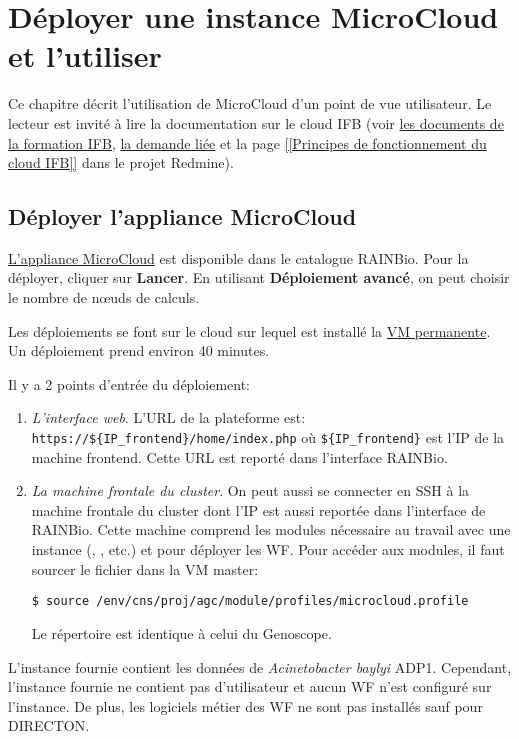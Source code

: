 \chapter{Déployer une instance MicroCloud et l'utiliser} \label{chap:deploiement}

Ce chapitre décrit l'utilisation de MicroCloud d'un point de vue utilisateur.
Le lecteur est invité à lire la documentation sur le cloud IFB
(voir \href{https://intranet.genoscope.cns.fr/agc/redmine/documents/86}{les documents de la formation IFB},
\href{https://intranet.genoscope.cns.fr/agc/redmine/issues/6010}{la demande liée}
et la page \href{https://intranet.genoscope.cns.fr/agc/redmine/projects/microcloud/wiki/Principes_de_fonctionnement_du_cloud_IFB}{[[Principes de fonctionnement du cloud IFB]]}
dans le projet Redmine).

\section{Déployer l'appliance MicroCloud}

\href{https://biosphere.france-bioinformatique.fr/catalogue/appliance/150/}{L'appliance MicroCloud} est disponible dans le catalogue RAINBio.
Pour la déployer, cliquer sur \textbf{Lancer}.
En utilisant \textbf{Déploiement avancé}, on peut choisir le nombre de nœuds de calculs.

Les déploiements se font sur le cloud  sur lequel est installé la \hyperref[VM permanente]{VM permanente}.
Un déploiement prend environ 40 minutes.

\bigskip

Il y a 2 points d'entrée du déploiement:
\begin{enumerate}
    \item \emph{L'interface web}. L'URL de la plateforme est: \nolinkurl{https://${IP_frontend}/home/index.php} où \nolinkurl{${IP_frontend}}
          est l'IP de la machine frontend.
          Cette URL est reporté dans l'interface RAINBio.
    \item \emph{La machine frontale du cluster}. On peut aussi se connecter en SSH à la machine frontale du cluster
          dont l'IP est aussi reportée dans l'interface de RAINBio.
          Cette machine comprend les modules nécessaire au travail avec une instance (, , etc.)
          et  pour déployer les WF.
          Pour accéder aux modules, il faut sourcer le fichier  dans la VM master:
          \begin{lstlisting}[style=bash,gobble=14]
              $ source /env/cns/proj/agc/module/profiles/microcloud.profile
          \end{lstlisting}
            Le répertoire  est identique à celui du Genoscope.
\end{enumerate}
L'instance fournie contient les données de \textit{Acinetobacter baylyi} ADP1.
Cependant, l'instance fournie ne contient pas d'utilisateur
et aucun WF n'est configuré sur l'instance.
De plus, les logiciels métier des WF ne sont pas installés
sauf pour DIRECTON.

